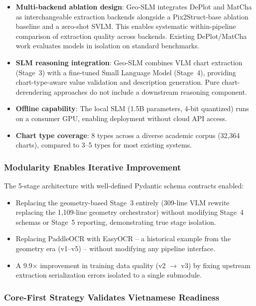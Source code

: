 \begin{itemize}
    \item \textbf{Multi-backend ablation design}: Geo-SLM integrates DePlot and MatCha
          as interchangeable extraction backends alongside a Pix2Struct-base ablation
          baseline and a zero-shot SVLM. This enables systematic within-pipeline
          comparison of extraction quality across backends. Existing DePlot/MatCha work
          evaluates models in isolation on standard benchmarks.
    \item \textbf{SLM reasoning integration}: Geo-SLM combines VLM chart extraction
          (Stage~3) with a fine-tuned Small Language Model (Stage~4), providing
          chart-type-aware value validation and description generation. Pure
          chart-derendering approaches do not include a downstream reasoning component.
    \item \textbf{Offline capability}: The local SLM (1.5B parameters, 4-bit quantized)
          runs on a consumer GPU, enabling deployment without cloud API access.
    \item \textbf{Chart type coverage}: 8 types across a diverse academic corpus
          (32,364 charts), compared to 3--5 types for most existing systems.
\end{itemize}

\subsubsection{Modularity Enables Iterative Improvement}

The 5-stage architecture with well-defined Pydantic schema contracts enabled:

\begin{itemize}
    \item Replacing the geometry-based Stage~3 entirely (309-line VLM rewrite replacing
          the 1,109-line geometry orchestrator) without modifying Stage~4 schemas or
          Stage~5 reporting, demonstrating true stage isolation.
    \item Replacing PaddleOCR with EasyOCR -- a historical example from the geometry
          era (v1--v5) -- without modifying any pipeline interface.
    \item A 9.9$\times$ improvement in training data quality (v2 $\to$ v3) by fixing
          upstream extraction serialization errors isolated to a single submodule.
\end{itemize}

\subsubsection{Core-First Strategy Validates Vietnamese Readiness}

